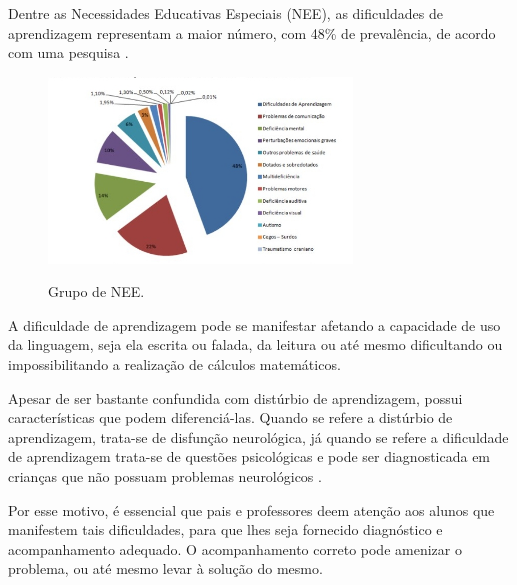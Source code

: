 \documentclass[
	12pt,				%
    oneside,			%
	a4paper,			%
	english,			%
	french,				%
	spanish,			%
	brazil,				%
	]{abntex2}
\begin{document}
Dentre as Necessidades Educativas Especiais (NEE), as dificuldades de aprendizagem representam a maior número, com 48\% de prevalência, de acordo com uma pesquisa \cite{Coelho}.
\begin{figure} [ht] 


\caption{Grupo de NEE.}

\includegraphics[width=0.72\textwidth]{graficoDA.jpg} %
\\
\centering
{}
\label{matematica} 
\end{figure}


A dificuldade de aprendizagem pode se manifestar afetando a capacidade de uso da linguagem, seja ela escrita ou falada, da leitura ou até mesmo dificultando ou impossibilitando a realização de cálculos matemáticos.


Apesar de ser bastante confundida com distúrbio de aprendizagem, possui características que podem diferenciá-las. Quando se refere a distúrbio de aprendizagem, trata-se de disfunção neurológica, já quando se refere a dificuldade de aprendizagem trata-se de questões psicológicas e pode ser diagnosticada em crianças que não possuam problemas neurológicos \cite{Felipe}.


Por esse motivo, é essencial que pais e professores deem atenção aos alunos que manifestem tais dificuldades, para que lhes seja fornecido diagnóstico e acompanhamento adequado. O acompanhamento correto pode amenizar o problema, ou até mesmo levar à solução do mesmo.
\end{document}

